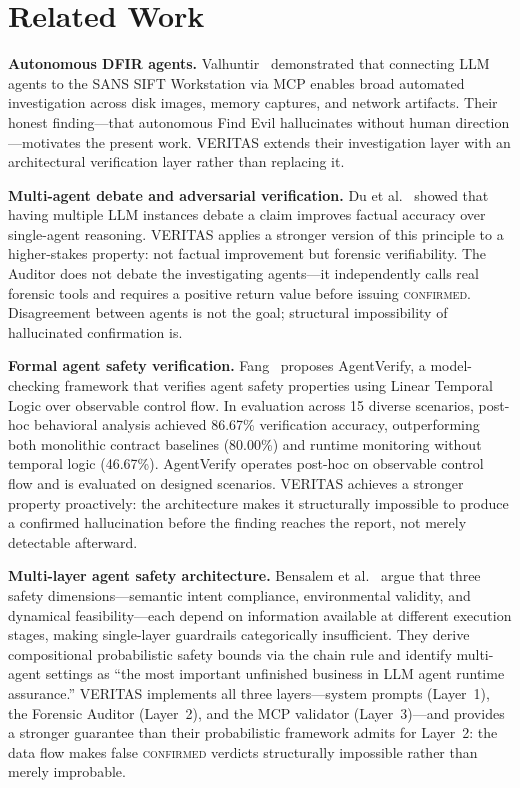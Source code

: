 \documentclass[sigconf, nonacm]{acmart}
\begin{document}
\section{Related Work}
\label{sec:related}

\textbf{Autonomous DFIR agents.}
Valhuntir~\cite{valhuntir} demonstrated that connecting LLM agents to the SANS
SIFT Workstation via MCP enables broad automated investigation across disk
images, memory captures, and network artifacts. Their honest finding---that
autonomous Find Evil hallucinates without human direction---motivates the present
work. VERITAS extends their investigation layer with an architectural verification
layer rather than replacing it.

\textbf{Multi-agent debate and adversarial verification.}
Du et al.~\cite{du2023debate} showed that having multiple LLM instances debate a
claim improves factual accuracy over single-agent reasoning. VERITAS applies a
stronger version of this principle to a higher-stakes property: not factual
improvement but forensic verifiability. The Auditor does not debate the investigating
agents---it independently calls real forensic tools and requires a positive return
value before issuing \textsc{confirmed}. Disagreement between agents is not the
goal; structural impossibility of hallucinated confirmation is.

\textbf{Formal agent safety verification.}
Fang~\cite{fang2026} proposes AgentVerify, a model-checking framework that
verifies agent safety properties using Linear Temporal Logic over observable
control flow. In evaluation across 15 diverse scenarios, post-hoc behavioral
analysis achieved 86.67\% verification accuracy, outperforming both monolithic
contract baselines (80.00\%) and runtime monitoring without temporal logic
(46.67\%). AgentVerify operates post-hoc on observable control flow and is
evaluated on designed scenarios. VERITAS achieves a stronger property
proactively: the architecture makes it structurally impossible to produce a
confirmed hallucination before the finding reaches the report, not merely
detectable afterward.

\textbf{Multi-layer agent safety architecture.}
Bensalem et al.~\cite{bensalem2026} argue that three safety dimensions---semantic
intent compliance, environmental validity, and dynamical feasibility---each
depend on information available at different execution stages, making
single-layer guardrails categorically insufficient. They derive compositional
probabilistic safety bounds via the chain rule and identify multi-agent settings
as ``the most important unfinished business in LLM agent runtime assurance.''
VERITAS implements all three layers---system prompts (Layer~1), the Forensic
Auditor (Layer~2), and the MCP validator (Layer~3)---and provides a stronger
guarantee than their probabilistic framework admits for Layer~2: the data flow
makes false \textsc{confirmed} verdicts structurally impossible rather than
merely improbable.
\end{document}
